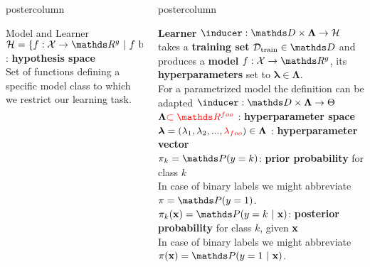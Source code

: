 \documentclass{beamer}
\newlength{\columnheight} %
\begin{document}
\begin{frame}[fragile]{}
\begin{columns}
\begin{column}{.31\textwidth}
\begin{beamercolorbox}[center]{postercolumn}
\begin{minipage}{.98\textwidth}
{\begin{myblock}{Model and Learner}
            $\Hspace = \{f : \Xspace \rightarrow \R^g ~|~ f \text{ belongs to a certain functional family}\}$ : \textbf{hypothesis space} \\
              \hspace*{1ex}Set of functions defining a specific model class to which we restrict our learning task. 					
					\end{myblock}\vfill
				}
			\end{minipage}
		\end{beamercolorbox}
	\end{column}
	\begin{column}{.31\textwidth}
		\begin{beamercolorbox}[center]{postercolumn}
			\begin{minipage}{.98\textwidth}
				\parbox[t][\columnheight]{\textwidth}{
					\begin{myblock}{} \vspace{-4ex}
						 \textbf{Learner }$\inducer: \preimageInducerShort \rightarrow \Hspace$  takes a \textbf{training set}  $\Dtrain \in \allDatasets$  and produces a \textbf{model} $f : \Xspace \rightarrow \R^g$, its \textbf{hyperparameters} set to $\bm{\lambda} \in \bm{\Lambda}$.\\
            \hspace*{1ex}For a parametrized model the definition can be adapted $\inducer: \preimageInducerShort \rightarrow \Theta$ \\
            
              $\bm{\Lambda} \textcolor{red}{\subset \R^{foo}}$ : \textbf{hyperparameter space} \\
            
              $\bm{\lambda} = (\lambda_1, \lambda_2, ..., \textcolor{red}{\lambda_{foo}}) \in \bm{\Lambda}$ : \textbf{hyperparameter vector} \\
              
              $\pi_k = \P(y = k)$:\textbf{ prior probability} for class $k$ \\
                \hspace*{1ex}In case of binary labels we might abbreviate $\pi = \P(y = 1)$. \\
             
              $\pikx = \postk$: \textbf{posterior probability} for class $k$, given $\mathbf{x}$ \\
                \hspace*{1ex}In case of binary labels we might abbreviate $\pix = \post$. \\
              

\end{myblock}}
\end{minipage}
\end{beamercolorbox}
\end{column}
\end{columns}
\end{frame}
\end{document}
